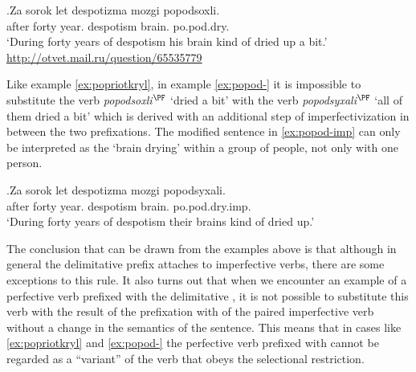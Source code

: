 \exg.\label{ex:popod-}Za sorok let despotizma mozgi popodsoxli.\\
after forty year. despotism brain. po.pod.dry.\\
\trans `During forty years of despotism his brain kind of dried up a bit.'\\\hbox{}\hfill\hbox{\url{http://otvet.mail.ru/question/65535779}}

Like example \ref{ex:popriotkryl}, in example \ref{ex:popod-} it is impossible to substitute the verb \textit{popodsoxli}$^{\PF}$ `dried a bit' with the verb \textit{popodsyxali}$^{\PF}$ `all of them dried a bit' which is derived with an additional step of imperfectivization in between the two prefixations. The modified sentence in \ref{ex:popod-imp} can only be interpreted as the `brain drying' within a group of people, not only with one person.  

\exg.\label{ex:popod-imp}Za sorok let despotizma mozgi popodsyxali.\\
after forty year. despotism brain. po.pod.dry.imp.\\
\trans `During forty years of despotism their brains kind of dried up.'

The conclusion that can be drawn from the examples above is that although in general the delimitative prefix  attaches to imperfective verbs, there are some exceptions to this rule. It also turns out that when we encounter an example of a perfective verb prefixed with the delimitative , it is not possible to substitute this verb with the result of the prefixation with  of the paired imperfective verb without a change in the semantics of the sentence. This means that in cases like \ref{ex:popriotkryl} and \ref{ex:popod-} the perfective verb prefixed with  cannot be regarded as a ``variant'' of the verb that obeys the selectional restriction.
 
